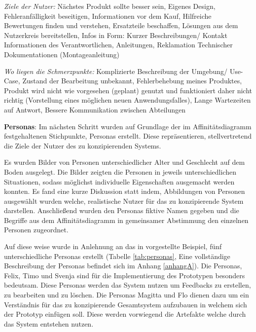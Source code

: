 \vspace{2mm}
\textit{Ziele der Nutzer: } 
Nächstes Produkt sollte besser sein, Eigenes Design, Fehleranfälligkeit beseitigen, Informationen vor dem Kauf, Hilfreiche Bewertungen finden und verstehen, Ersatzteile beschaffen, Lösungen aus dem Nutzerkreis bereitstellen, Infos in Form: Kurzer Beschreibungen/ Kontakt Informationen des Verantwortlichen, Anleitungen, Reklamation Technischer Dokumentationen (Montageanleitung)

\vspace{2mm}
\textit{Wo liegen die Schmerzpunkte: } 
Komplizierte Beschreibung der Umgebung/ Use-Case, Zustand der Bearbeitung unbekannt, Fehlerbehebung meines Produktes, Produkt wird nicht wie vorgesehen (geplant) genutzt und funktioniert daher nicht richtig (Vorstellung eines möglichen neuen Anwendungsfalles), Lange Wartezeiten auf Antwort, Bessere Kommunikation zwischen Abteilungen

\textbf{Personas}:
Im nächsten Schritt wurden auf Grundlage der im  Affinitätsdiagramm festgehaltenen Stichpunkte, Personas erstellt. Diese repräsentieren, stellvertretend die Ziele der 
Nutzer des zu konzipierenden Systems.

Es wurden Bilder von Personen unterschiedlicher Alter und Geschlecht auf dem Boden ausgelegt. Die Bilder zeigten die Personen in jeweils unterschiedlichen Situationen, 
sodass möglichst individuelle Eigenschaften ausgemacht werden konnten. Es fand eine kurze Diskussion statt indem, Abbildungen von Personen ausgewählt wurden welche, realistische 
Nutzer für das zu konzipierende System darstellen. Anschließend wurden den Personas fiktive Namen gegeben und die Begriffe aus dem Affinitätsdiagramm in gemeinsamer Abstimmung den 
einzelnen Personen zugeordnet. 

Auf diese weise wurde in Anlehnung an das in \cite[S.~57]{MichaelRichter2016} vorgestellte Beispiel, fünf unterschiedliche Personas erstellt (Tabelle \ref{tab:personas}, Eine vollständige Beschreibung der Personas befindet sich im Anhang \ref{anhangA}). Die Personas, Felix, Timo und Svenja sind für die Implementierung des Prototypen besonders bedeutsam. Diese Personas werden das System nutzen um Feedbacks zu erstellen, 
zu bearbeiten und zu löschen. Die Personas Magitta und Flo dienen dazu um ein Verständnis für das zu konzipierende Gesamtsystem aufzubauen in welchem sich der Prototyp einfügen soll. Diese werden vorwiegend die Artefakte 
welche durch das System entstehen nutzen. 

